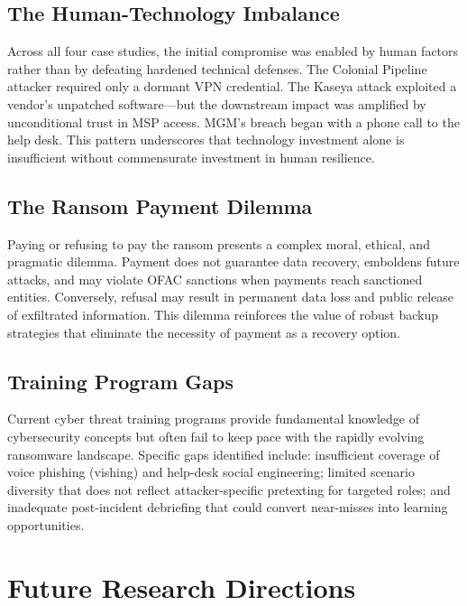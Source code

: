\documentclass[sigconf,nonacm]{acmart}
\begin{document}
\subsection{The Human-Technology Imbalance}

Across all four case studies, the initial compromise was enabled by human factors rather
than by defeating hardened technical defenses. The Colonial Pipeline attacker required
only a dormant VPN credential. The Kaseya attack exploited a vendor's unpatched
software---but the downstream impact was amplified by unconditional trust in MSP access.
MGM's breach began with a phone call to the help desk. This pattern underscores that
technology investment alone is insufficient without commensurate investment in human
resilience.

\subsection{The Ransom Payment Dilemma}

Paying or refusing to pay the ransom presents a complex moral, ethical, and pragmatic
dilemma. Payment does not guarantee data recovery, emboldens future attacks, and may
violate OFAC sanctions when payments reach sanctioned entities. Conversely, refusal may
result in permanent data loss and public release of exfiltrated information. This
dilemma reinforces the value of robust backup strategies that eliminate the necessity
of payment as a recovery option.

\subsection{Training Program Gaps}

Current cyber threat training programs provide fundamental knowledge of cybersecurity
concepts but often fail to keep pace with the rapidly evolving ransomware landscape.
Specific gaps identified include: insufficient coverage of voice phishing (vishing) and
help-desk social engineering; limited scenario diversity that does not reflect
attacker-specific pretexting for targeted roles; and inadequate post-incident
debriefing that could convert near-misses into learning opportunities.

\section{Future Research Directions}
\end{document}
